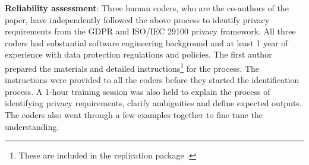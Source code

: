 %
%

\textbf{Reliability assessment}: Three human coders, who are the co-authors of the paper, have independently followed the above process to identify privacy requirements from the GDPR and ISO/IEC 29100 privacy framework. All three coders had substantial software engineering background and at least 1 year of experience with data protection regulations and policies. The first author prepared the materials and detailed instructions\footnote{These are included in the replication package \cite{reppkg-pridp}.} for the process. The instructions were provided to all the coders before they started the identification process. A 1-hour training session was also held to explain the process of identifying privacy requirements, clarify ambiguities and define expected outputs. The coders also went through a few examples together to fine tune the understanding.

